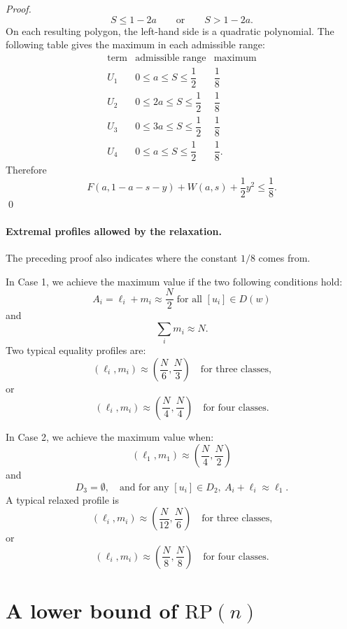 \documentclass[runningheads,envcountsame,a4paper]{llncs}
\newcommand{\rp}{\mathrm{RP}}
\begin{document}
\begin{proof}
\[
S\le 1-2a
\qquad\text{or}\qquad
S>1-2a.
\]
On each resulting polygon, the left-hand side is a quadratic polynomial.  The
following table gives the maximum in each admissible range:
\[
\begin{array}{c|c|c}
\text{term} & \text{admissible range} & \text{maximum} \\ \hline
U_1 & 0\le a\le S\le \dfrac12 & \dfrac18 \\[6pt]
U_2 & 0\le 2a\le S\le \dfrac12 & \dfrac18 \\[6pt]
U_3 & 0\le 3a\le S\le \dfrac12 & \dfrac18 \\[6pt]
U_4 & 0\le a\le S\le \dfrac12 & \dfrac18 .
\end{array}
\]
\fi
Therefore
\[
F(a,1-a-s-y)+W(a,s)+\frac12y^2\le \frac18.
\] \qed
\end{proof}

\paragraph{Extremal profiles allowed by the relaxation.}
The preceding proof also indicates where the constant \(1/8\) comes from.

In Case 1, we achieve the maximum value if the two following conditions hold: 
\[
A_i=\ell_i+m_i\approx \frac N2 \; \text{for all $[u_i] \in D(w)$}
\]
and
\[
\sum_i m_i\approx N.
\]
Two typical equality profiles are:
\[
(\ell_i,m_i)\approx \left(\frac N6,\frac N3\right)
\quad\text{for three classes,}
\]
or
\[
(\ell_i,m_i)\approx \left(\frac N4,\frac N4\right)
\quad\text{for four classes.}
\]

In Case 2,  we achieve the maximum value when: 
\[
(\ell_1,m_1)\approx \left(\frac N4,\frac N2\right)
\]
and 
\[
D_3=\emptyset, \quad\text{and for any }[u_i]\in D_2,\  A_i+\ell_i \approx \ell_1.
\]
A typical relaxed profile is
\[
(\ell_i,m_i)\approx \left(\frac N{12},\frac N6\right)
\quad\text{for three classes,}
\]
or
\[
(\ell_i,m_i)\approx \left(\frac N8,\frac N8\right)
\quad\text{for four classes.}
\]

\section{A lower bound of $\rp(n)$}
\end{document}
